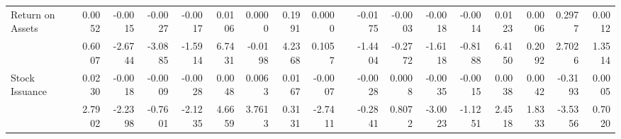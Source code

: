 \begin{table}[h]
{\begin{tabular}{lrrrrrrrrrrrrrrrrr}
      Return on Assets & 0.0052 & -0.0015 & -0.0027 & -0.0017 & 0.0106 & 0.0000 & 0.1991 & 0.0000 &       & -0.0175 & -0.0003 & -0.0018 & -0.0014 & 0.0123 & 0.0006 & 0.2977 & 0.0012 \\
            & 0.6007 & -2.6744 & -3.0885 & -1.5914 & 6.7431 & -0.0198 & 4.2368 & 0.1057 &       & -1.4404 & -0.2772 & -1.6118 & -0.8188 & 6.4150 & 0.2092 & 2.7026 & 1.3514 \\
      Stock Issuance & 0.0230 & -0.0018 & -0.0009 & -0.0028 & 0.0048 & 0.0063 & 0.0167 & -0.0007 &       & -0.0028 & 0.0008 & -0.0035 & -0.0015 & 0.0038 & 0.0042 & -0.3193 & 0.0005 \\
            & 2.7902 & -2.2398 & -0.7601 & -2.1235 & 4.6659 & 3.7613 & 0.3131 & -2.7411 &       & -0.2841 & 0.8072 & -3.0023 & -1.1251 & 2.4518 & 1.8333 & -3.5356 & 0.7020 \\
      \bottomrule
      \end{tabular}%
    }
    \label{tab:vol-ff6v}%
  \end{table}%
  
